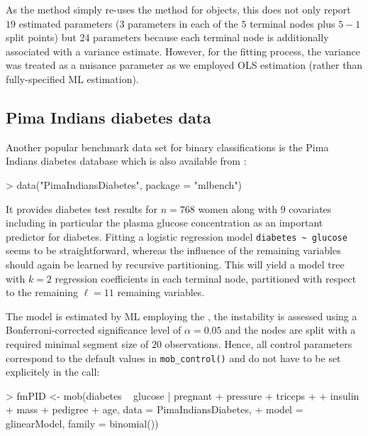 \documentclass{Z}
\begin{document}
As the  method simply re-uses the method for  objects,
this does not only report $19$ estimated parameters ($3$ parameters in
each of the $5$ terminal nodes plus $5 - 1$ split points) but
$24$ parameters because each terminal node is additionally associated with a 
variance estimate. However, for the fitting process, the variance was treated as a nuisance 
parameter as we employed OLS estimation (rather than fully-specified ML estimation). 


\subsection{Pima Indians diabetes data}

Another popular benchmark data set for binary classifications is the Pima Indians
diabetes database which is also available from :

\begin{Schunk}
\begin{Sinput}
> data("PimaIndiansDiabetes", package = "mlbench")
\end{Sinput}
\end{Schunk}

It provides diabetes test results for $n = 768$ women
along with $9$ covariates including in particular
the plasma glucose concentration  as an important predictor for diabetes.
Fitting a logistic regression model \verb:diabetes ~ glucose: seems to be straightforward,
whereas the influence of the remaining variables should again be learned by recursive
partitioning. This will yield a model tree with $k = 2$ regression coefficients in each terminal
node, partitioned with respect to the remaining $\ell = 11$ remaining variables.

The model is estimated by ML employing the , 
the instability is assessed using a Bonferroni-corrected
significance level of $\alpha = 0.05$ and the nodes are split with a required minimal
segment size of $20$ observations. Hence, all control parameters correspond to the
default values in \verb:mob_control(): and do not have to be set explicitely in 
the  call:

\begin{Schunk}
\begin{Sinput}
> fmPID <- mob(diabetes ~ glucose | pregnant + pressure + triceps + 
+     insulin + mass + pedigree + age, data = PimaIndiansDiabetes, 
+     model = glinearModel, family = binomial())
\end{Sinput}
\end{Schunk}
\end{document}
